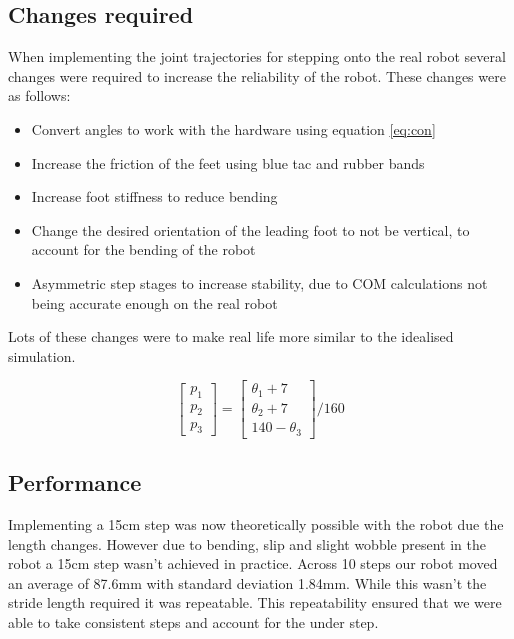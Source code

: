 \documentclass[twoside,twocolumn]{article}
\begin{document}
\subsection{Changes required} 
When implementing the joint trajectories for stepping onto the real robot several changes were required to increase the reliability of the robot. These changes were as follows:
\begin{itemize}
\item Convert angles to work with the hardware using equation \ref{eq:con} 

\item Increase the friction of the feet using blue tac and rubber bands
\item Increase foot stiffness to reduce bending
\item Change the desired orientation of the leading foot to not be vertical, to account for the bending of the robot
\item  Asymmetric step stages to increase stability, due to COM calculations not being accurate enough on the real robot
\end{itemize}
Lots of these changes were to make real life more similar to the idealised simulation.

\begin{equation}
\begin{bmatrix}
p_1 \\
p_2 \\
p_3
\end{bmatrix}
=
\begin{bmatrix}
\theta_1 + 7 \\
\theta_2 + 7 \\
140-\theta_3
\end{bmatrix}/160
\label{eq:con}
\end{equation}

\subsection{Performance}
Implementing a 15cm step was now theoretically possible with the robot due the length changes. However due to bending, slip and slight wobble present in the robot a 15cm step wasn't achieved in practice. Across 10 steps our robot moved an average of 87.6mm with standard deviation 1.84mm. While this wasn't the stride length required it was repeatable. This repeatability ensured that we were able to take consistent steps and account for the under step.
\end{document}
